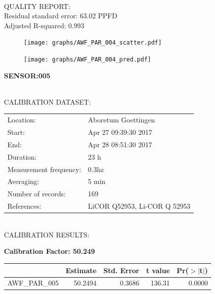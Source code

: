 \documentclass[oneside]{report}
\begin{document}
\hrulefill\\
QUALITY REPORT:\\
Residual standard error: 63.02 PPFD\\
Adjusted R-squared: 0.993



\begin{figure}[H]
  \centering
  \texttt{[image: graphs/AWF\_PAR\_004\_scatter.pdf]}
\end{figure}




\begin{figure}[H]
  \centering
  \texttt{[image: graphs/AWF\_PAR\_004\_pred.pdf]}
\end{figure}

\pagebreak


\begin{center}
\large{\textbf{SENSOR:005}}\\
\end{center}

\hrulefill\\
CALIBRATION DATASET:\\
\begin{table}[h!]
  \centering
  \label{tab:table1}
  \begin{tabular}{ll}
    Location: & Aboretum Goettingen\\ 
    
    
    Start:  & Apr 27 09:39:30 2017 \\
    End:   & Apr 28 08:51:30 2017\\ 
    Duration: & 23 h\\
    Measurement frequency: & 0.3hz\\
    Averaging:  &5 min\\
    Number of records: & 169 \\
    References: & LiCOR Q52953, Li-COR Q 52953 \\
  \end{tabular}
\end{table}

\hrulefill\\
CALIBRATION RESULTS:\\


\begin{center}
\textbf{\large{Calibration Factor: 50.249}}\\
\end{center}
\begin{table}[ht]
\centering
\begin{tabular}{rrrrr}
  \hline
 & Estimate & Std. Error & t value & Pr($>$$|$t$|$) \\ 
  \hline
AWF\_PAR\_005 & 50.2494 & 0.3686 & 136.31 & 0.0000 \\ 
   \hline
\end{tabular}
\end{table}
\end{document}
